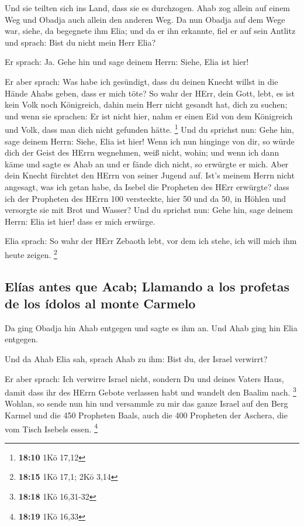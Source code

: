  Und sie teilten sich ins Land, dass sie es durchzogen.
Ahab zog allein auf einem Weg und Obadja auch allein den anderen Weg.
 Da nun Obadja auf dem Wege war, siehe, da begegnete ihm
Elia; und da er ihn erkannte, fiel er auf sein Antlitz und sprach: Bist
du nicht mein Herr Elia?

 Er sprach: Ja. Gehe hin und sage deinem Herrn: Siehe,
Elia ist hier!

 Er aber sprach: Was habe ich gesündigt, dass du deinen
Knecht willst in die Hände Ahabs geben, dass er mich töte?
 So wahr der HErr, dein Gott, lebt, es ist kein Volk noch
Königreich, dahin mein Herr nicht gesandt hat, dich zu suchen; und wenn
sie sprachen: Er ist nicht hier, nahm er einen Eid von dem Königreich
und Volk, dass man dich nicht gefunden hätte. \footnote{\textbf{18:10}
  1Kö 17,12}  Und du sprichst nun: Gehe hin, sage deinem
Herrn: Siehe, Elia ist hier!  Wenn ich nun hinginge von
dir, so würde dich der Geist des HErrn wegnehmen, weiß nicht, wohin; und
wenn ich dann käme und sagte es Ahab an und er fände dich nicht, so
erwürgte er mich. Aber dein Knecht fürchtet den HErrn von seiner Jugend
auf.  Ist's meinem Herrn nicht angesagt, was ich getan
habe, da Isebel die Propheten des HErr erwürgte? dass ich der Propheten
des HErrn 100 versteckte, hier 50 und da 50, in Höhlen und versorgte sie
mit Brot und Wasser?  Und du sprichst nun: Gehe hin, sage
deinem Herrn: Elia ist hier! dass er mich erwürge.

 Elia sprach: So wahr der HErr Zebaoth lebt, vor dem ich
stehe, ich will mich ihm heute zeigen. \footnote{\textbf{18:15} 1Kö
  17,1; 2Kö 3,14}

\hypertarget{eluxedas-antes-que-acab-llamando-a-los-profetas-de-los-uxeddolos-al-monte-carmelo}{%
\subsection{Elías antes que Acab; Llamando a los profetas de los ídolos
al monte
Carmelo}\label{eluxedas-antes-que-acab-llamando-a-los-profetas-de-los-uxeddolos-al-monte-carmelo}}

 Da ging Obadja hin Ahab entgegen und sagte es ihm an.
Und Ahab ging hin Elia entgegen.

 Und da Ahab Elia sah, sprach Ahab zu ihm: Bist du, der
Israel verwirrt?

 Er aber sprach: Ich verwirre Israel nicht, sondern Du
und deines Vaters Haus, damit dass ihr des HErrn Gebote verlassen habt
und wandelt den Baalim nach. \footnote{\textbf{18:18} 1Kö 16,31-32}
 Wohlan, so sende nun hin und versammle zu mir das ganze
Israel auf den Berg Karmel und die 450 Propheten Baals, auch die 400
Propheten der Aschera, die vom Tisch Isebels essen. \footnote{\textbf{18:19}
  1Kö 16,33}

